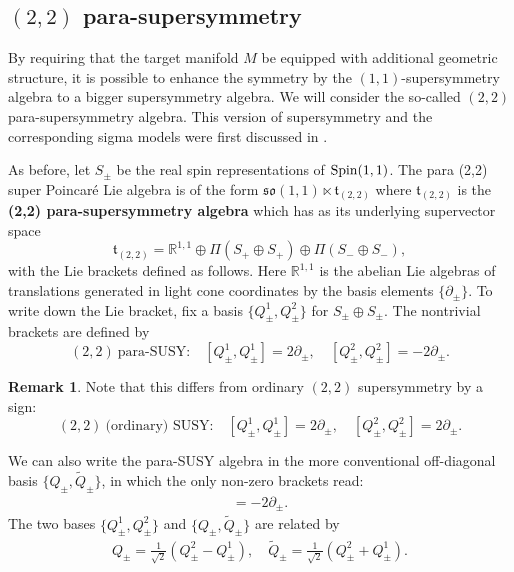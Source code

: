 \documentclass[letterpaper,12pt]{article}
\newcommand{\RR}{\mathbb{R}}
\newcommand{\p}{\partial}
\newcommand{\wtl}{\widetilde}
\theoremstyle{definition}
\newtheorem{remark}[theorem]{Remark}
\theoremstyle{remark}
\theoremstyle{examples}
\begin{document}
\subsection{$(2,2)$ para-supersymmetry}\label{sec:(2,2)parasusy}
By requiring that the target manifold $M$ be equipped with additional geometric structure, it is possible to enhance the symmetry by the $(1,1)$-supersymmetry algebra to a bigger supersymmetry algebra.
We will consider the so-called $(2,2)$ para-supersymmetry algebra. 
This version of supersymmetry and the corresponding sigma models were first discussed in \cite{HullTwistedSUSY}.

As before, let $S_\pm$ be the real spin representations of ${\rm Spin}(1,1)$.
The para (2,2) super Poincar\'{e} Lie algebra is of the form $\mathfrak{so}(1,1) \ltimes \mathfrak{t}_{(2,2)}$ where $\mathfrak{t}_{(2,2)}$ is the {\bf (2,2) para-supersymmetry algebra} which has as its underlying supervector space
\[
\mathfrak{t}_{(2,2)} = \RR^{1,1} \oplus \Pi(S_+ \oplus S_+) \oplus \Pi(S_- \oplus S_-) ,
\]
with the Lie brackets defined as follows.
Here $\RR^{1,1}$ is the abelian Lie algebras of translations generated in light cone coordinates by the basis elements $\{\partial_{\pm}\}$.
To write down the Lie bracket, fix a basis $\{Q^1_{\pm}, Q^2_\pm\}$ for $S_\pm \oplus S_\pm$.
The nontrivial brackets are defined by 
\begin{equation}\label{eq:(2,2)para}
(2,2)\ \text{para-SUSY:}\quad [Q_\pm^1, Q_\pm^1] = 2 \partial_{\pm}, \quad [Q_{\pm}^2, Q_{\pm}^2] = -2 \partial_{\pm} .
\end{equation}

\begin{remark}
Note that this differs from ordinary $(2,2)$ supersymmetry by a sign:
\begin{equation*}
(2,2)\ \text{(ordinary) SUSY:}\quad [Q_\pm^1, Q_\pm^1] = 2 \partial_{\pm}, \quad [Q_{\pm}^2, Q_{\pm}^2] = 2 \partial_{\pm} .
\end{equation*}
\end{remark}

We can also write the para-SUSY algebra in the more conventional off-diagonal basis $\{{Q}_\pm,\wtl{Q}_\pm\}$, in which the only non-zero brackets read:
\begin{align*}
[{Q}_\pm,\wtl{Q}_\pm]=-2\p_\pm.
\end{align*}
The two bases $\{Q^1_{\pm}, Q^2_\pm\}$ and $\{{Q}_\pm,\wtl{Q}_\pm\}$ are related by
\begin{align}\label{parasusy_offdiagonal_basis}
Q_\pm=\frac{1}{\sqrt{2}}(Q^2_\pm-Q^1_\pm),\quad \wtl{Q}_\pm=\frac{1}{\sqrt{2}}(Q^2_\pm+Q^1_\pm).
\end{align}
\end{document}
